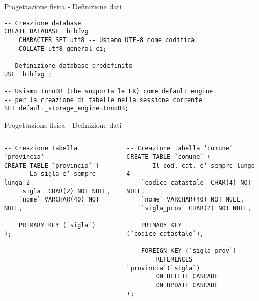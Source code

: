 \begin{frame}[fragile]{Progettazione fisica - Definizione dati}
    \begin{verbatim}
-- Creazione database
CREATE DATABASE `bibfvg`
    CHARACTER SET utf8 -- Usiamo UTF-8 come codifica
    COLLATE utf8_general_ci;

-- Definizione database predefinito
USE `bibfvg`;

-- Usiamo InnoDB (che supporta le FK) come default engine
-- per la creazione di tabelle nella sessione corrente
SET default_storage_engine=InnoDB;
    \end{verbatim}
\end{frame}

\begin{frame}[fragile]{Progettazione fisica - Definizione dati}
    \begin{columns}[T]
        \begin{column}[T]{.45\textwidth}
            \begin{verbatim}
-- Creazione tabella ‘provincia‘
CREATE TABLE `provincia` (
    -- La sigla e‘ sempre lunga 2
    `sigla` CHAR(2) NOT NULL,
    `nome` VARCHAR(40) NOT NULL,

    PRIMARY KEY (`sigla`)
);
            \end{verbatim}
        \end{column}
        \begin{column}[T]{.45\textwidth}
            \begin{verbatim}
-- Creazione tabella ‘comune‘
CREATE TABLE `comune` (
    -- Il cod. cat. e‘ sempre lungo 4
    `codice_catastale` CHAR(4) NOT NULL,
    `nome` VARCHAR(40) NOT NULL,
    `sigla_prov` CHAR(2) NOT NULL,

    PRIMARY KEY (`codice_catastale`),

    FOREIGN KEY (`sigla_prov`)
        REFERENCES `provincia`(`sigla`)
        ON DELETE CASCADE
        ON UPDATE CASCADE
);
            \end{verbatim}
        \end{column}
    \end{columns}
\end{frame}

